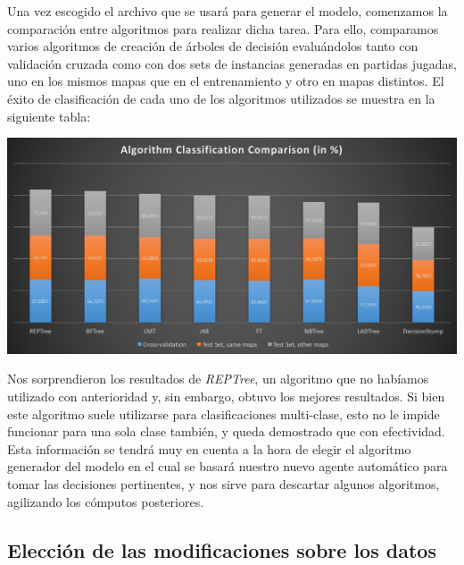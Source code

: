 \documentclass[12pt]{article}
\begin{document}
Una vez escogido el archivo que se usará para generar el modelo, comenzamos la comparación entre algoritmos para realizar dicha tarea. Para ello, comparamos varios algoritmos de creación de árboles de decisión evaluándolos tanto con validación cruzada como con dos sets de instancias generadas en partidas jugadas, uno en los mismos mapas que en el entrenamiento y otro en mapas distintos. El éxito de clasificación de cada uno de los algoritmos utilizados se muestra en la siguiente tabla:

\vspace{0.3cm}

\noindent \includegraphics[width=\textwidth]{algorithm_comparison}

\vspace{0.3cm}

Nos sorprendieron los resultados de \emph{REPTree}, un algoritmo que no habíamos utilizado con anterioridad y, sin embargo, obtuvo los mejores resultados. Si bien este algoritmo suele utilizarse para clasificaciones multi-clase, esto no le impide funcionar para una sola clase también, y queda demostrado que con efectividad. Esta información se tendrá muy en cuenta a la hora de elegir el algoritmo generador del modelo en el cual se basará nuestro nuevo agente automático para tomar las decisiones pertinentes, y nos sirve para descartar algunos algoritmos, agilizando los cómputos posteriores.

\subsection{Elección de las modificaciones sobre los datos}
\end{document}
